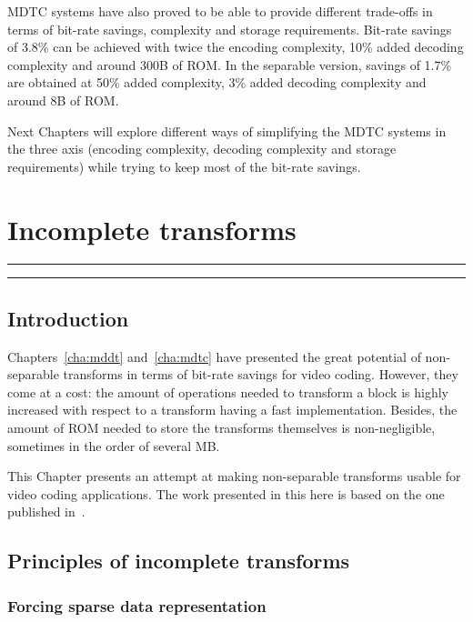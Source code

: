\documentclass[11pt,a4paper,openright,twoside]{book}
\providecommand{\chaptertoc}{
	\startcontents[chapters]
	\hrule
	\vspace{1em}
	\printcontents[chapters]{}{1}{{\bf\large Contents}}
	\hrule
}
\numberwithin{equation}{section} %
\numberwithin{figure}{section} %
\numberwithin{table}{section} %
\begin{document}
\ac{MDTC} systems have also proved to be able to provide different trade-offs
in terms of bit-rate savings, complexity and storage requirements.
Bit-rate savings of 3.8\% can be achieved with twice the encoding complexity,
10\% added decoding complexity and around \unit{300}{\kilo B} of \acs{ROM}.
In the separable version, savings of 1.7\% are obtained at 50\% added
complexity, 3\% added decoding complexity and around \unit{8}{\kilo B} of
\acs{ROM}.

Next Chapters will explore different ways of simplifying the \ac{MDTC} systems
in the three axis (encoding complexity, decoding complexity and storage
requirements) while trying to keep most of the bit-rate savings.

\chapter{Incomplete transforms}
\label{cha:incomplete_transforms}
\chaptertoc

\section{Introduction}
\label{sec:it_introduction}

Chapters~\ref{cha:mddt} and~\ref{cha:mdtc} have presented the great potential
of non-separable transforms in terms of bit-rate savings for video coding.
However, they come at a cost:
the amount of operations needed to transform a block is highly increased with
respect to a transform having a fast implementation.
Besides, the amount of \acs{ROM} needed to store the transforms themselves is
non-negligible, sometimes in the order of several MB.

This Chapter presents an attempt at making non-separable transforms usable for
video coding applications.
The work presented in this here is based on the one published
in~\cite{arrufat-15-inc-transforms}.

\section{Principles of incomplete transforms}
\label{sec:principles_of_incomplete_transforms}

\subsection{Forcing sparse data representation}
\label{sub:it_forcing_sparse_data_representation}
\end{document}
